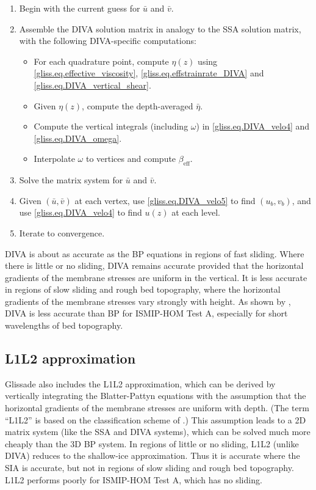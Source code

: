 {\begin{enumerate}
\item Begin with the current guess for $\bar{u}$ and $\bar{v}$.
\item Assemble the DIVA solution matrix in analogy to the SSA solution matrix,
  with the following DIVA-specific computations:
  \begin{itemize}
    \item For each quadrature point, compute $\eta(z)$ using \eqref{gliss.eq.effective_viscosity},
      \eqref{gliss.eq.effstrainrate_DIVA} and \eqref{gliss.eq.DIVA_vertical_shear}.
    \item Given $\eta(z)$, compute the depth-averaged $\bar{\eta}$.
    \item Compute the vertical integrals (including $\omega$) in \eqref{gliss.eq.DIVA_velo4} 
      and \eqref{gliss.eq.DIVA_omega}.
    \item Interpolate $\omega$ to vertices and compute $\beta_\text{eff}$.
\end{itemize} 
\item Solve the matrix system for $\bar{u}$ and $\bar{v}$.
\item Given $(\bar{u}, \bar{v})$ at each vertex, use \eqref{gliss.eq.DIVA_velo5} to find $(u_b, v_b)$,
  and use \eqref{gliss.eq.DIVA_velo4} to find $u(z)$ at each level.
\item Iterate to convergence.
\end{enumerate}

DIVA is about as accurate as the BP equations in regions of fast sliding.  
Where there is little or no sliding, DIVA remains accurate provided that
the horizontal gradients of the membrane stresses are uniform in the vertical.
It is less accurate in regions of slow sliding and rough bed topography, where
the horizontal gradients of the membrane stresses vary strongly with height.
As shown by \citet{Goldberg2011}, DIVA is less accurate than BP for ISMIP-HOM Test A,
especially for short wavelengths of bed topography.

\subsection{L1L2 approximation}

Glissade also includes the L1L2 approximation, which can be derived by vertically integrating
the Blatter-Pattyn equations with the assumption that the horizontal gradients of the membrane
stresses are uniform with depth.
(The term ``L1L2'' is based on the classification scheme of \citet{Hindmarsh2004}.)  
This assumption leads to a 2D matrix system (like the SSA and DIVA systems), which can be solved
much more cheaply than the 3D BP system.
In regions of little or no sliding, L1L2 (unlike DIVA) reduces to the
shallow-ice approximation.  Thus it is accurate where the SIA is accurate,
but not in regions of slow sliding and rough bed topography.
L1L2 performs poorly for ISMIP-HOM Test A, which has no sliding.

}
